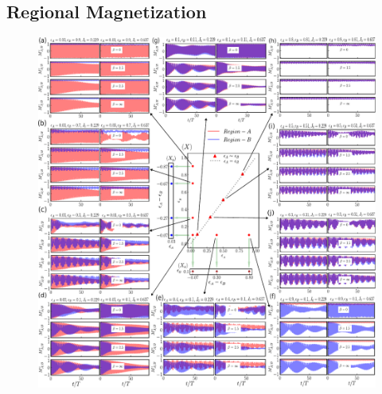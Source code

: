 \documentclass[12pt]{iopart}
\providecommand{\DIFdelbegin}{} %
\providecommand{\DIFdelend}{} %
\providecommand{\DIFaddbeginFL}{} %
\providecommand{\DIFaddendFL}{} %
\providecommand{\DIFdelbeginFL}{} %
\providecommand{\DIFdelendFL}{} %
\newcommand{\DIFscaledelfig}{0.5}
\newlength{\DIFdelgraphicswidth} %
\newlength{\DIFdelgraphicsheight} %
\newcommand{\DIFaddincludegraphics}[2][]{{\color{blue}\fbox{\DIFOincludegraphics[#1]{#2}}}} %
\newcommand{\DIFdelincludegraphics}[2][]{%
\sbox{\DIFdelgraphicsbox}{\DIFOincludegraphics[#1]{#2}}%
\settoboxwidth{\DIFdelgraphicswidth}{\DIFdelgraphicsbox} %
\settoboxtotalheight{\DIFdelgraphicsheight}{\DIFdelgraphicsbox} %
\scalebox{\DIFscaledelfig}{%
\parbox[b]{\DIFdelgraphicswidth}{\usebox{\DIFdelgraphicsbox}\\[-\baselineskip] \rule{\DIFdelgraphicswidth}{0em}}\llap{\resizebox{\DIFdelgraphicswidth}{\DIFdelgraphicsheight}{%
\setlength{\unitlength}{\DIFdelgraphicswidth}%
\begin{picture}(1,1)%
\thicklines\linethickness{2pt} %
{\color[rgb]{1,0,0}\put(0,0){\framebox(1,1){}}}%
{\color[rgb]{1,0,0}\put(0,0){\line( 1,1){1}}}%
{\color[rgb]{1,0,0}\put(0,1){\line(1,-1){1}}}%
\end{picture}%
}\hspace*{3pt}}} %
} %
\DeclareRobustCommand{\DIFdelbegin}{\DIFOdelbegin \let\includegraphics\DIFdelincludegraphics} %
\DeclareRobustCommand{\DIFdelend}{\DIFOaddend \let\includegraphics\DIFOincludegraphics} %
\DeclareRobustCommand{\DIFaddbeginFL}{\DIFOaddbeginFL \let\includegraphics\DIFaddincludegraphics} %
\DeclareRobustCommand{\DIFaddendFL}{\DIFOaddendFL \let\includegraphics\DIFOincludegraphics} %
\DeclareRobustCommand{\DIFdelbeginFL}{\DIFOdelbeginFL \let\includegraphics\DIFdelincludegraphics} %
\DeclareRobustCommand{\DIFdelendFL}{\DIFOaddendFL \let\includegraphics\DIFOincludegraphics} %
\begin{document}
\DIFdelend \subsection{\label{sec:level42} Regional Magnetization}
\DIFdelbegin %
\DIFdelendFL \DIFaddbeginFL \begin{figure}[t]
	\DIFaddendFL \centering
	\DIFdelbeginFL %
\DIFdelendFL \DIFaddbeginFL \includegraphics[width = 15.0cm]{figure8.pdf}

\end{figure}
\end{document}
